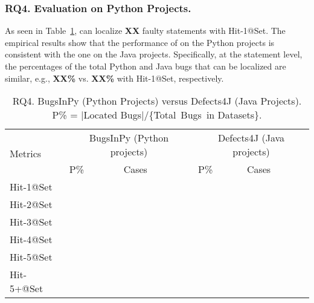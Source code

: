 \subsubsection{\bf RQ4. Evaluation on Python Projects.}
As seen in Table~\ref{RQ4}, {\tool} can localize {\bf XX} faulty
statements with Hit-1@Set. The empirical results show that the
performance of {\tool} on the Python projects is consistent with the
one on the Java projects. Specifically, at the statement level, the
percentages of the total Python and Java bugs that can be localized
are similar, e.g., {\bf XX\%} vs. {\bf XX\%} with Hit-1@Set,
respectively.



\begin{table}[t]
	\caption{RQ4. BugsInPy (Python Projects) versus Defects4J (Java Projects). P\% = $|$Located Bugs$|$/\{Total~Bugs~in Datasets\}.}
	\vspace{-5pt}
	{\footnotesize
		\begin{center}
			\tabcolsep 2.7pt
			\begin{tabular}{p{1.4cm}<{\centering}|p{1.55cm}<{\centering}p{1.55cm}<{\centering}|p{1.55cm}<{\centering}p{1.55cm}<{\centering}}\hline\cline{2-5}	
				
		\multirow{2}{*}{Metrics}& \multicolumn{2}{c|}{BugsInPy (Python projects)} & \multicolumn{2}{c}{Defects4J (Java projects)}\\\cline{2-5}
				 & P\%& Cases &P\%& Cases \\ \hline
				
				Hit-1@Set &   &  &&\\ 
				\hline
				 
			    Hit-2@Set &   & &&\\
				\hline
				
				
				Hit-3@Set &   & &&\\
				\hline
				
				Hit-4@Set &   & &&\\
				\hline
				
				Hit-5@Set &   & &&\\
				\hline
				
				Hit-5+@Set &   & &&\\
				\hline
			\end{tabular}
			\label{RQ4}
		\end{center}
	}
\end{table}



